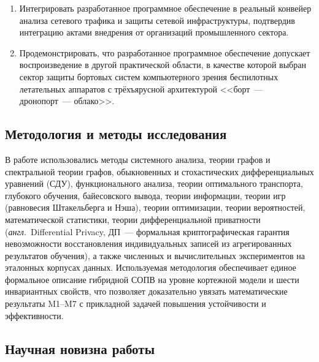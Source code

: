 \documentclass[12pt,a5paper]{article}
\begin{document}
\begin{enumerate}
\item Интегрировать разработанное программное обеспечение в
реальный конвейер анализа сетевого трафика и защиты сетевой
инфраструктуры, подтвердив интеграцию актами внедрения от
организаций промышленного сектора.

\item Продемонстрировать, что разработанное программное
обеспечение допускает воспроизведение в другой практической
области, в качестве которой выбран сектор защиты бортовых
систем компьютерного зрения беспилотных летательных
аппаратов с трёхъярусной архитектурой
<<борт~--- дронопорт~--- облако>>.
\end{enumerate}

\subsection*{Методология и методы исследования}

В работе использовались методы системного анализа, теории
графов и спектральной теории графов, обыкновенных и
стохастических дифференциальных уравнений (СДУ),
функционального анализа, теории оптимального транспорта,
глубокого обучения, байесовского вывода, теории информации,
теории игр (равновесия Штакельберга и Нэша), теории
оптимизации, теории вероятностей, математической статистики,
теории дифференциальной приватности
(\emph{англ.}~Differential Privacy, ДП~--- формальная
криптографическая гарантия невозможности восстановления
индивидуальных записей из агрегированных результатов
обучения), а также численных и вычислительных экспериментов
на эталонных корпусах данных. Используемая методология
обеспечивает единое формальное описание гибридной СОПВ на
уровне кортежной модели и шести инвариантных свойств, что
позволяет доказательно увязать математические результаты
M1--M7 с прикладной задачей повышения устойчивости и
эффективности.

\subsection*{Научная новизна работы}
\end{document}
